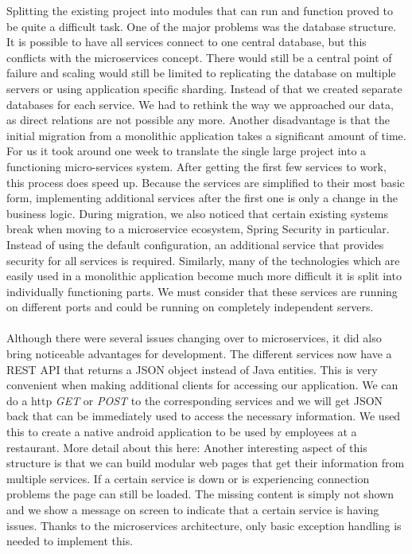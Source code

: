 \documentclass[12pt]{article}
\begin{document}
\begin{multicols}{2}
\noindent Splitting the existing project into modules that can run and function proved to be quite a difficult task. One of the major problems was the database structure. It is possible to have all services connect to one central database, but this conflicts with the microservices concept. There would still be a central point of failure and scaling would still be limited to replicating the database on multiple servers or using application specific sharding. Instead of that we created separate databases for each service. We had to rethink the way we approached our data, as direct relations are not possible any more. Another disadvantage is that the initial migration from a monolithic application takes a significant amount of time. For us it took around one week to translate the single large project into a functioning micro-services system. After getting the first few services to work, this process does speed up. Because the services are simplified to their most basic form, implementing additional services after the first one is only a change in the business logic. During migration, we also noticed that certain existing systems break when moving to a microservice ecosystem, Spring Security in particular. Instead of using the default configuration, an additional service that provides security for all services is required. Similarly, many of the technologies which are easily used in a monolithic application become much more difficult it is split into individually functioning parts. We must consider that these services are running on different ports and could be running on completely independent servers.
\\\\
Although there were several issues changing over to microservices, it did also bring noticeable advantages for development. The different services now have a REST API that returns a JSON object instead of Java entities. This is very convenient when making additional clients for accessing our application. We can do a http \textit{GET} or \textit{POST} to the corresponding services and we will get JSON back that can be immediately used to access the necessary information. We used this to create a native android application to be used by employees at a restaurant. More detail about this here: %
Another interesting aspect of this structure is that we can build modular web pages that get their information from multiple services. If a certain service is down or is experiencing connection problems the page can still be loaded. The missing content is simply not shown and we show a message on screen to indicate that a certain service is having issues. Thanks to the microservices architecture, only basic exception handling is needed to implement this.

\end{multicols}
\end{document}
